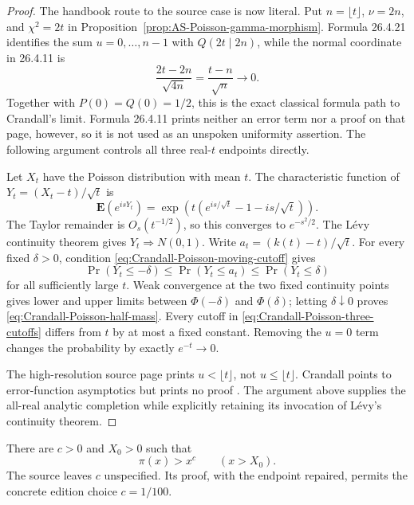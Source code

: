 \begin{proof}
The handbook route to the source case is now literal.  Put
$n=\lfloor t\rfloor$, $\nu=2n$, and $\chi^2=2t$ in
Proposition~\ref{prop:AS-Poisson-gamma-morphism}.  Formula 26.4.21 identifies
the sum $u=0,\ldots,n-1$ with $Q(2t\mid2n)$, while the normal coordinate in
26.4.11 is
\[
 \frac{2t-2n}{\sqrt{4n}}=\frac{t-n}{\sqrt n}\longrightarrow0.
\]
Together with $P(0)=Q(0)=1/2$, this is the exact classical formula path to
Crandall's limit.  Formula 26.4.11 prints neither an error term nor a proof on
that page, however, so it is not used as an unspoken uniformity assertion.
The following argument controls all three real-$t$ endpoints directly.

Let $X_t$ have the Poisson distribution with mean $t$.  The characteristic
function of $Y_t=(X_t-t)/\sqrt t$ is
\[
 \mathbf E(e^{isY_t})
 =\exp\!\left(t\left(e^{is/\sqrt t}-1-is/\sqrt t\right)\right).
\]
The Taylor remainder is $O_s(t^{-1/2})$, so this converges to
$e^{-s^2/2}$.  The L\'evy continuity theorem gives
$Y_t\Rightarrow N(0,1)$.  Write $a_t=(k(t)-t)/\sqrt t$.  For every fixed
$\delta>0$, condition \eqref{eq:Crandall-Poisson-moving-cutoff} gives
\[
 \Pr(Y_t\leq-\delta)
 \leq \Pr(Y_t\leq a_t)
 \leq \Pr(Y_t\leq\delta)
\]
for all sufficiently large $t$.  Weak convergence at the two fixed continuity
points gives lower and upper limits between $\Phi(-\delta)$ and
$\Phi(\delta)$; letting $\delta\downarrow0$ proves
\eqref{eq:Crandall-Poisson-half-mass}.  Every cutoff in
\eqref{eq:Crandall-Poisson-three-cutoffs} differs from $t$ by at most a fixed
constant.  Removing the $u=0$ term changes the probability by exactly
$e^{-t}\to0$.

The high-resolution source page prints
$u<\lfloor t\rfloor$, not $u\leq\lfloor t\rfloor$.  Crandall points to
error-function asymptotics but prints no proof
\cite[p.~1287, Lem.~6.1]{Crandall1978}.  The argument above supplies the
all-real analytic completion while explicitly retaining its invocation of
L\'evy's continuity theorem.
\end{proof}

\begin{theorem}
\label{thm:Crandall-power-law-count}
There are $c>0$ and $X_0>0$ such that
\begin{equation}
\label{eq:Crandall-power-law-count}
 \pi(x)>x^c\qquad(x>X_0).
\end{equation}
The source leaves $c$ unspecified.  Its proof, with the endpoint repaired,
permits the concrete edition choice $c=1/100$.
\end{theorem}

